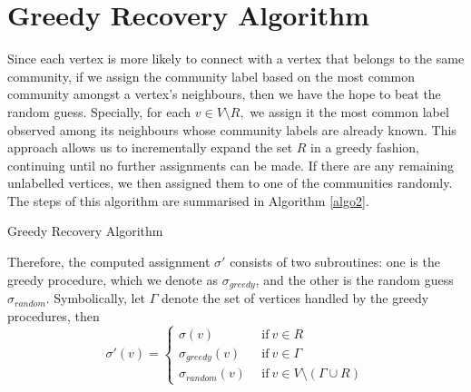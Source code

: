 \section{Greedy Recovery Algorithm}\label{sec: greedy recovery}
Since each vertex is more likely to connect with a vertex that belongs to the same community, if we assign the community label based on the most common community amongst a vertex's neighbours, then we have the hope to beat the random guess. Specially, for each $v\in V\setminus R,$ we assign it the most common label observed among its neighbours whose community labels are already known. This approach allows us to incrementally expand the set $R$ in a greedy fashion, continuing until no further assignments can be made. If there are any remaining unlabelled vertices, we then assigned them to one of the communities randomly. The steps of this algorithm are summarised in Algorithm \ref{algo2}.\\
\begin{algorithm}[H]\label{algo2} 

\BlankLine
\caption{Greedy Recovery Algorithm}
\end{algorithm}
Therefore, the computed assignment $\sigma'$ consists of two subroutines: one is the greedy procedure, which we denote as $\sigma_{greedy}$, and the other is the random guess $\sigma_{random}$. Symbolically, let $\Gamma$ denote the set of vertices handled by the greedy procedures, then \begin{equation}\label{equn:3.1}
    \sigma'(v)=\begin{cases}
    \sigma(v)~&~\text{if}~v\in R\\
    \sigma_{greedy}(v)~&~\text{if}~v\in \Gamma\\
    \sigma_{random}(v)~&~\text{if}~v\in V\setminus(\Gamma\cup R)
    \end{cases}
\end{equation}
